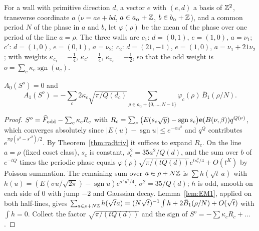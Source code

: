 For a wall with primitive direction $d$, a vector $e$ with $(e,d)$ a basis of $\mathbb{Z}^2$, transverse coordinate $a$ ($\nu=ae+bd$, $a\in a_\alpha+\mathbb{Z}$, $b\in b_\alpha+\mathbb{Z}$),
and a common period $N$ of the phase in $a$ and $b$, let $\varphi(\rho)$ be the mean of the phase over one period of the line $a=\rho$. The three walls are
$c_1$: $d=(0,1)$, $e=(1,0)$, $a=\nu_1$; $c'$: $d=(1,0)$, $e=(0,1)$, $a=\nu_2$; $c_2$: $d=(21,-1)$, $e=(1,0)$, $a=\nu_1+21\nu_2$; with weights $\kappa_{c_1}=-\frac14$,
$\kappa_{c'}=\frac14$, $\kappa_{c_2}=-\frac12$, so that the odd weight is $o=\sum_c\kappa_c\operatorname{sgn}(a_c)$.
\begin{corollary}\label{cor:A1odd}
$A_0(S^o)=0$ and
\[ A_1(S^o)=-\sum_c2\kappa_c\sqrt{\pi/Q(d_c)}\sum_{\rho\in a_\alpha+\{0,\dots,N-1\}}\varphi_c(\rho)\,\bar B_1(\rho/N). \]
\end{corollary}
\begin{proof}
$S^o=\widehat F_{\rm odd}-\sum_c\kappa_c R_c$ with $R_c=\sum_\nu\big(E(s_c\sqrt y)-\operatorname{sgn}s_c\big)\mathbf{e}(B(\nu,\beta))q^{Q(\nu)}$, which converges absolutely since
$|E(u)-\operatorname{sgn}u|\le e^{-\pi u^2}$ and $q^{Q}$ contributes $e^{\pi y(s^2-s'^2)/2}$. By Theorem~\ref{thm:radtriv} it suffices to expand $R_c$. On the line $a=\rho$
(fixed coset class), $s_c$ is constant, $s_c^2=35a^2/Q(d)$, and the sum over $b$ of $e^{-tQ}$ times the periodic phase equals $\varphi(\rho)\sqrt{\pi/(tQ(d))}e^{ts_c^2/4}+O(t^K)$ by
Poisson summation. The remaining sum over $a\in\rho+N\mathbb{Z}$ is $\sum h(\sqrt t\,a)$ with $h(u)=(E(\sigma u/\sqrt{2\pi})-\operatorname{sgn}u)e^{\sigma^2u^2/4}$, $\sigma^2=35/Q(d)$;
$h$ is odd, smooth on each side of $0$ with jump $-2$ and Gaussian decay. Lemma~\ref{lem:EM1}, applied on both half-lines, gives
$\sum_{a\in\rho+N\mathbb{Z}}h(\sqrt t a)=(N\sqrt t)^{-1}\int h+2\bar B_1(\rho/N)+O(\sqrt t)$ with $\int h=0$. Collect the factor $\sqrt{\pi/(tQ(d))}$ and the sign of $S^o=-\sum\kappa_cR_c+\dots$.
\end{proof}

